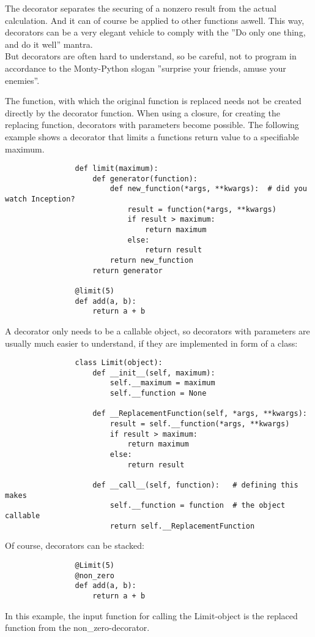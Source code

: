 			The decorator separates the securing of a nonzero result from the actual calculation.
			And it can of course be applied to other functions aswell.
			This way, decorators can be a very elegant vehicle to comply with the ''Do only one thing, and do it well'' mantra.\\
			But decorators are often hard to understand, so be careful, not to program in accordance to the Monty-Python slogan ''surprise your friends, amuse your enemies''.

			The function, with which the original function is replaced needs not be created directly by the decorator function.
			When using a closure, for creating the replacing function, decorators with parameters become possible.
			The following example shows a decorator that limits a functions return value to a specifiable maximum.
			\begin{verbatim}
				def limit(maximum):
					def generator(function):
						def new_function(*args, **kwargs):	# did you watch Inception?
							result = function(*args, **kwargs)
							if result > maximum:
								return maximum
							else:
								return result
						return new_function
					return generator

				@limit(5)
				def add(a, b):
					return a + b
			\end{verbatim}

			A decorator only needs to be a callable object, so decorators with parameters are usually much easier to understand, if they are implemented in form of a class:
			\begin{verbatim}
				class Limit(object):
					def __init__(self, maximum):
						self.__maximum = maximum
						self.__function = None

					def __ReplacementFunction(self, *args, **kwargs):
						result = self.__function(*args, **kwargs)
						if result > maximum:
							return maximum
						else:
							return result

					def __call__(self, function):   # defining this makes
						self.__function = function  # the object callable
						return self.__ReplacementFunction
			\end{verbatim}

			Of course, decorators can be stacked:
			\begin{verbatim}
				@Limit(5)
				@non_zero
				def add(a, b):
					return a + b
			\end{verbatim}
			In this example, the input function for calling the {\normalfont \ttfamily Limit}-object is the replaced function from the {\normalfont \ttfamily non\_zero}-decorator.


